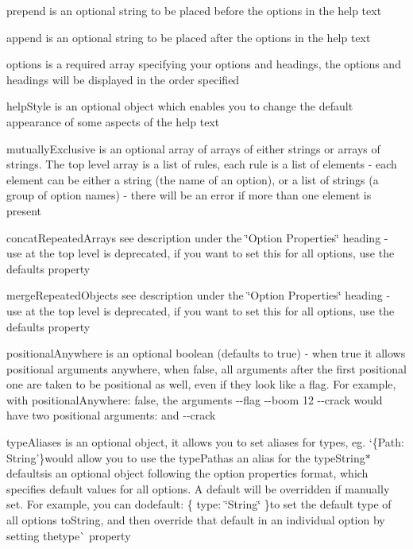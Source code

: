 \begin{DoxyItemize}
\item {\ttfamily prepend} is an optional string to be placed before the options in the help text
\item {\ttfamily append} is an optional string to be placed after the options in the help text
\item {\ttfamily options} is a required array specifying your options and headings, the options and headings will be displayed in the order specified
\item {\ttfamily help\+Style} is an optional object which enables you to change the default appearance of some aspects of the help text
\item {\ttfamily mutually\+Exclusive} is an optional array of arrays of either strings or arrays of strings. The top level array is a list of rules, each rule is a list of elements -\/ each element can be either a string (the name of an option), or a list of strings (a group of option names) -\/ there will be an error if more than one element is present
\item {\ttfamily concat\+Repeated\+Arrays} see description under the \char`\"{}\+Option Properties\char`\"{} heading -\/ use at the top level is deprecated, if you want to set this for all options, use the {\ttfamily defaults} property
\item {\ttfamily merge\+Repeated\+Objects} see description under the \char`\"{}\+Option Properties\char`\"{} heading -\/ use at the top level is deprecated, if you want to set this for all options, use the {\ttfamily defaults} property
\item {\ttfamily positional\+Anywhere} is an optional boolean (defaults to {\ttfamily true}) -\/ when {\ttfamily true} it allows positional arguments anywhere, when {\ttfamily false}, all arguments after the first positional one are taken to be positional as well, even if they look like a flag. For example, with {\ttfamily positional\+Anywhere\+: false}, the arguments {\ttfamily -\/-\/flag -\/-\/boom 12 -\/-\/crack} would have two positional arguments\+: {} and {\ttfamily -\/-\/crack}
\item {\ttfamily type\+Aliases} is an optional object, it allows you to set aliases for types, eg. `\{Path\+: \textquotesingle{}String'\}{\ttfamily would allow you to use the type}Path{\ttfamily as an alias for the type}String{\ttfamily  $\ast$}defaults{\ttfamily is an optional object following the option properties format, which specifies default values for all options. A default will be overridden if manually set. For example, you can do}default\+: \{ type\+: \char`\"{}\+String\char`\"{} \}{\ttfamily to set the default type of all options to}String{\ttfamily , and then override that default in an individual option by setting the}type\`{} property
\end{DoxyItemize}

